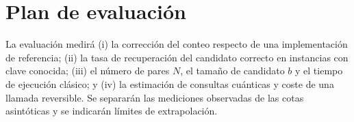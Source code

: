 \section{Plan de evaluación}

La evaluación medirá (i) la corrección del conteo respecto de una implementación de referencia; (ii) la tasa de recuperación del candidato correcto en instancias con clave conocida; (iii) el número de pares \(N\), el tamaño de candidato \(b\) y el tiempo de ejecución clásico; y (iv) la estimación de consultas cuánticas y coste de una llamada reversible. Se separarán las mediciones observadas de las cotas asintóticas y se indicarán límites de extrapolación.
